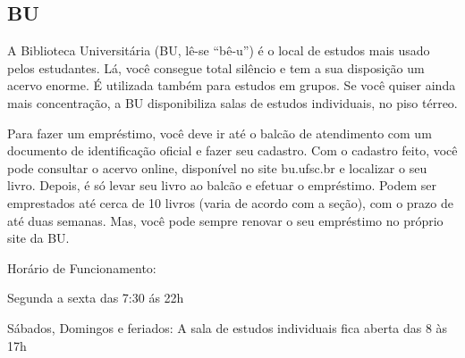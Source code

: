 \subsection{BU}
A Biblioteca Universitária (BU, lê-se “bê-u”) é o local de estudos mais usado pelos estudantes. Lá, você consegue total silêncio e tem a sua disposição um acervo enorme. É utilizada também para estudos em grupos. Se você quiser ainda mais concentração, a BU disponibiliza salas de estudos individuais, no piso térreo.

Para fazer um empréstimo, você deve ir até o balcão de atendimento com um documento de identificação oficial  e fazer seu cadastro. Com o cadastro feito, você pode consultar o acervo online, disponível no site bu.ufsc.br e localizar o seu livro. Depois, é só levar seu livro ao balcão e efetuar o empréstimo. Podem ser emprestados até cerca de 10 livros (varia de acordo com a seção), com o prazo de até duas semanas. Mas, você pode sempre renovar o seu empréstimo no próprio site da BU.

Horário de Funcionamento:


Segunda a sexta das 7:30 ás 22h

Sábados, Domingos e feriados: A sala de estudos individuais fica aberta das 8 às 17h
